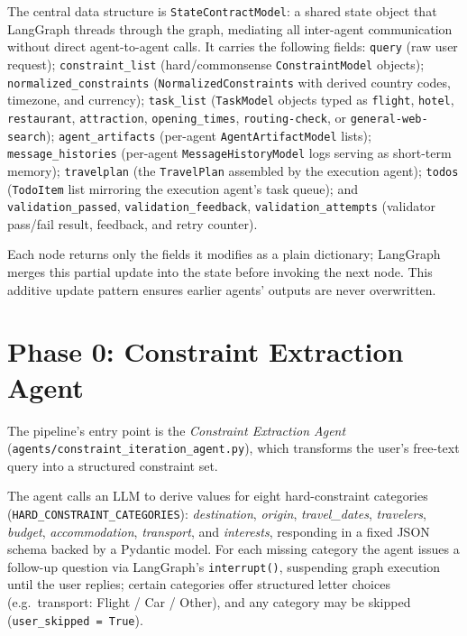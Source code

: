 \documentclass[a4paper,oneside,bibliography=totoc]{scrbook}
\begin{document}
The central data structure is \texttt{StateContractModel}: a shared state
object that LangGraph threads through the graph, mediating all inter-agent
communication without direct agent-to-agent calls. It carries the following
fields:
\texttt{query} (raw user request);
\texttt{constraint\_list} (hard/commonsense \texttt{ConstraintModel} objects);
\texttt{normalized\_constraints} (\texttt{NormalizedConstraints} with derived
country codes, timezone, and currency);
\texttt{task\_list} (\texttt{TaskModel} objects typed as \texttt{flight},
\texttt{hotel}, \texttt{restaurant}, \texttt{attraction},
\texttt{opening\_times}, \texttt{routing-check}, or
\texttt{general-web-search});
\texttt{agent\_artifacts} (per-agent \texttt{AgentArtifactModel} lists);
\texttt{message\_histories} (per-agent \texttt{MessageHistoryModel} logs
serving as short-term memory);
\texttt{travelplan} (the \texttt{TravelPlan} assembled by the execution agent);
\texttt{todos} (\texttt{TodoItem} list mirroring the execution agent's task
queue); and
\texttt{validation\_passed}, \texttt{validation\_feedback},
\texttt{validation\_attempts} (validator pass/fail result, feedback, and
retry counter).

Each node returns only the fields it modifies as a plain dictionary; LangGraph
merges this partial update into the state before invoking the next node. This
additive update pattern ensures earlier agents' outputs are never overwritten.


\section{Phase 0: Constraint Extraction Agent}
\label{sec:system:constraint}
The pipeline's entry point is the \emph{Constraint Extraction Agent}
(\texttt{agents/constraint\_iteration\_agent.py}), which transforms the
user's free-text query into a structured constraint set.

The agent calls an LLM to derive values for eight hard-constraint categories
(\texttt{HARD\_CONSTRAINT\_CATEGORIES}): \emph{destination}, \emph{origin},
\emph{travel\_dates}, \emph{travelers}, \emph{budget}, \emph{accommodation},
\emph{transport}, and \emph{interests}, responding in a fixed JSON schema backed
by a Pydantic model. For each missing category the agent issues a follow-up
question via LangGraph's \texttt{interrupt()}, suspending graph execution until
the user replies; certain categories offer structured letter choices (e.g.\
transport: Flight / Car / Other), and any category may be skipped
(\texttt{user\_skipped = True}).
\end{document}

